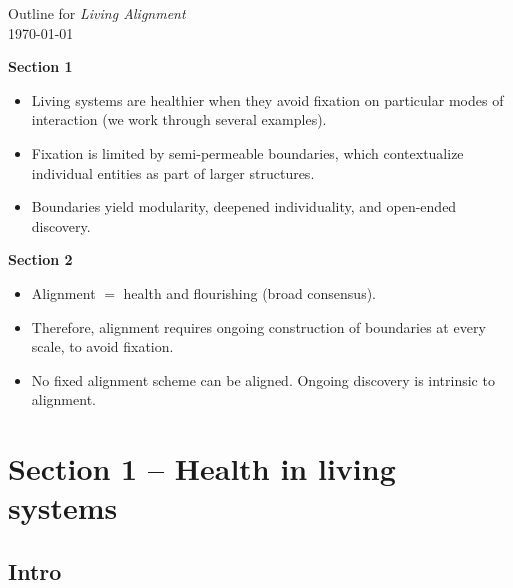 \documentclass[11pt]{article}
\newcommand{\titleblock}{%
  \begin{center}
    {\LARGE Outline for \textit{Living Alignment}}\\[0.4em]
    {\normalsize\today}
  \end{center}
}
\begin{document}
\vspace{-2.5em}
\titleblock
\vspace{-1em}

\medskip
\begin{previewbox}
\noindent\textbf{Section 1}
\begin{itemize}[leftmargin=2.0em, itemsep=0.3ex]
  \item Living systems are healthier when they avoid fixation on particular modes of interaction (we work through several examples).
  \item Fixation is limited by semi-permeable boundaries, which contextualize individual entities as part of larger structures.
  \item Boundaries yield modularity, deepened individuality, and open-ended discovery.
\end{itemize} \textbf{Section 2}
\begin{itemize}[leftmargin=2.0em, itemsep=0.3ex]
  \item Alignment $=$ health and flourishing (broad consensus).
  \item Therefore, alignment requires ongoing construction of boundaries at every scale, to avoid fixation.
  \item No fixed alignment scheme can be aligned. Ongoing discovery is intrinsic to alignment.
\end{itemize}
\end{previewbox}

\section*{Section 1 -- Health in living systems}

\subsection*{Intro}
\end{document}
